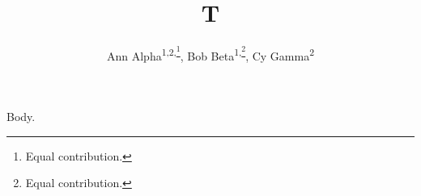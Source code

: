 \documentclass{article}
\newcommand\eqc{\thanks{Equal contribution.}}
\newcommand*\samethanks[1][\value{footnote}]{\footnotemark[#1]}
\begin{document}
\title{T}
\author{Ann Alpha\textsuperscript{\rm 1,2,\eqc}, Bob Beta\textsuperscript{\rm 1,\eqc}, Cy Gamma\textsuperscript{2\samethanks}}
\maketitle
Body.
\end{document}
